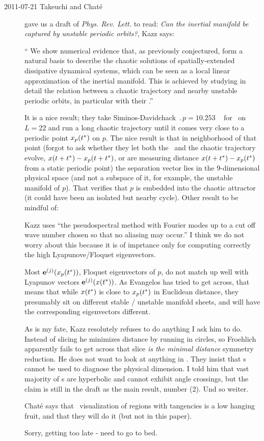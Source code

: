 \begin{description}

\item[2011-07-21 Takeuchi and Chat\'e]
gave us a draft of \emph{Phys. Rev. Lett.} to read:
\emph{Can the inertial manifold be captured by unstable periodic orbits?},
Kazz says:

`` We show numerical evidence that, as previously conjectured,
{\cLvs} form a natural basis to describe the
chaotic solutions of spatially-extended dissipative dynamical
systems, which can be seen as a local linear approximation of the
inertial manifold. This is achieved by studying in detail the
relation between a chaotic trajectory and nearby unstable periodic
orbits, in particular with their {\cLvs}.''

It is a nice result; they take Siminos-Davidchack $\period{p} = 10.253$
\po\  for \KS\ on $L = 22$ and run a long chaotic trajectory until it
comes very close to a periodic point $\ssp_p(t^*) $ on $p$. The nice
result is that in neighborhood of that point (forgot to ask whether they
let both the \po\ and the chaotic trajectory evolve, $\ssp(t+t^*) -
\ssp_p(t+t^*)$, or are measuring distance $\ssp(t+t^*) - \ssp_p(t^*)$ from a
static periodic point) the separation vector lies in the 9-dimensional
physical space (and not a subspace of it, for example, the unstable
manifold of $p$). That verifies that $p$ is embedded into the chaotic
attractor (it could have been an isolated but nearby cycle).
Other result to be mindful of:

Kazz uses ``the pseudospectral method with Fourier modes up to a cut off
wave number chosen so that no aliasing may occur.'' I think we do not
worry about this because it is of imprtance only for computing correctly
the high Lyapunove/Floquet eigenvectors.

Most $\jEigvec[j](\ssp_p(t^*))$, Floquet eigenvectors of $p$, do not match
up well with Lyapunov vectors $\jEigvec[j](\ssp(t^*))$. As Evangelos has
tried to get across, that means that while $\ssp(t^*)$ is close to
$\ssp_p(t^*) $ in Euclidean distance, they presumably sit on different
stable / unstable manifold sheets, and will have the corresponding
eigenvectors different.

As is my fate, Kazz resolutely refuses to do anything I ask him to do.
Instead of slicing he minimizes distance by running in circles, so
Froehlich apparently fails to get across that slice \emph{is
the minimal distance} symmetry reduction. He does not want to look at anything in
\statesp. They insist that \po s cannot be used to diagnose the physical dimension.
I told him that vast majority of \po s are hyperbolic and cannot exhibit angle crossings,
but the claim is still in the draft as the main result, number (2). Und so weiter.

Chat\'e says that \statesp\ visualization of regions with tangencies is a
low hanging fruit, and that they will do it (but not in this paper).

Sorry, getting too late - need to go to bed.

\end{description}


